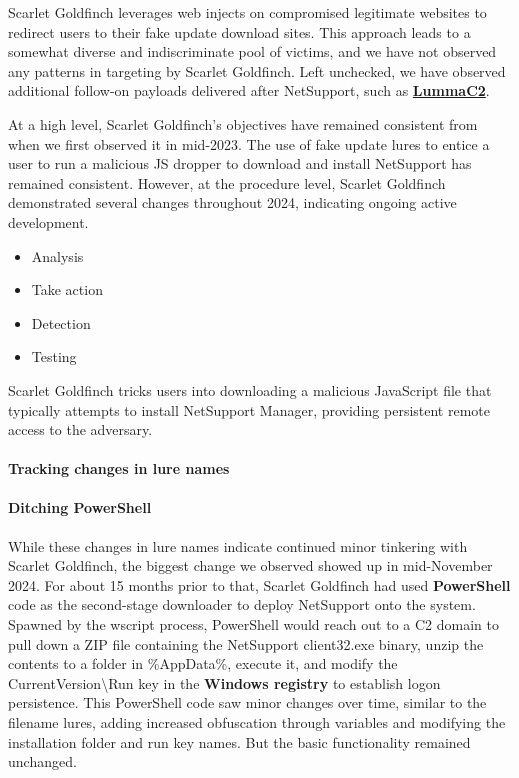 Scarlet Goldfinch leverages web injects on compromised legitimate websites to redirect users to their fake update download sites. This approach leads to a somewhat diverse and indiscriminate pool of victims, and we have not observed any patterns in targeting by Scarlet Goldfinch. Left unchecked, we have observed additional follow-on payloads delivered after NetSupport, such as \href{https://redcanary.com/threat-detection-report/threats/lummaC2/}{\textbf{LummaC2}}.

At a high level, Scarlet Goldfinch’s objectives have remained consistent from when we first observed it in mid-2023. The use of fake update lures to entice a user to run a malicious JS dropper to download and install NetSupport has remained consistent. However, at the procedure level, Scarlet Goldfinch demonstrated several changes throughout 2024, indicating ongoing active development.

\begin{itemize}
    \item Analysis
    \item Take action
    \item Detection
    \item Testing
\end{itemize}
Scarlet Goldfinch tricks users into downloading a malicious JavaScript file that typically attempts to install NetSupport Manager, providing persistent remote access to the adversary.

\paragraph{\textbf{Tracking changes in lure names}}

\paragraph{\textbf{Ditching PowerShell}}

While these changes in lure names indicate continued minor tinkering with Scarlet Goldfinch, the biggest change we observed showed up in mid-November 2024. For about 15 months prior to that, Scarlet Goldfinch had used \textbf{PowerShell} code as the second-stage downloader to deploy NetSupport onto the system. Spawned by the wscript process, PowerShell would reach out to a C2 domain to pull down a ZIP file containing the NetSupport client32.exe binary, unzip the contents to a folder in \%AppData\%, execute it, and modify the CurrentVersion\textbackslash{}Run key in the \textbf{Windows registry} to establish logon persistence. This PowerShell code saw minor changes over time, similar to the filename lures, adding increased obfuscation through variables and modifying the installation folder and run key names. But the basic functionality remained unchanged.

